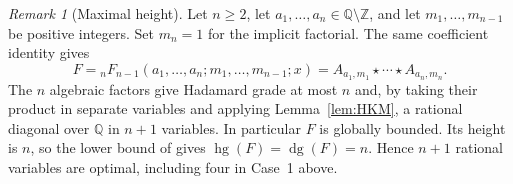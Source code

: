 \documentclass[11pt]{amsart}
\theoremstyle{definition}
\theoremstyle{remark}
\newtheorem{remark}[theorem]{Remark}
\numberwithin{equation}{section}
\newcommand{\Q}{\mathbb{Q}}
\newcommand{\Z}{\mathbb{Z}}
\DeclareMathOperator{\hg}{hg}
\DeclareMathOperator{\dg}{dg}
\begin{document}
\begin{remark}[Maximal height]\label{rem:maxheight}
Let $n\ge2$, let $a_1,\ldots,a_n\in\Q\setminus\Z$, and let $m_1,\ldots,m_{n-1}$ be positive integers. Set $m_n=1$ for the implicit factorial. The same coefficient identity gives
\[
 F={}_nF_{n-1}(a_1,\ldots,a_n;m_1,\ldots,m_{n-1};x)
 = A_{a_1,m_1}\star\cdots\star A_{a_n,m_n}.
\]
The $n$ algebraic factors give Hadamard grade at most $n$ and, by taking their product in separate variables and applying Lemma~\ref{lem:HKM}, a rational diagonal over $\Q$ in $n+1$ variables. In particular $F$ is globally bounded. Its height is $n$, so the lower bound of \citet[Theorem~3.8]{HarderKramerMiller2025} gives $\hg(F)=\dg(F)=n$. Hence $n+1$ rational variables are optimal, including four in Case~1 above.
\end{remark}
\end{document}
